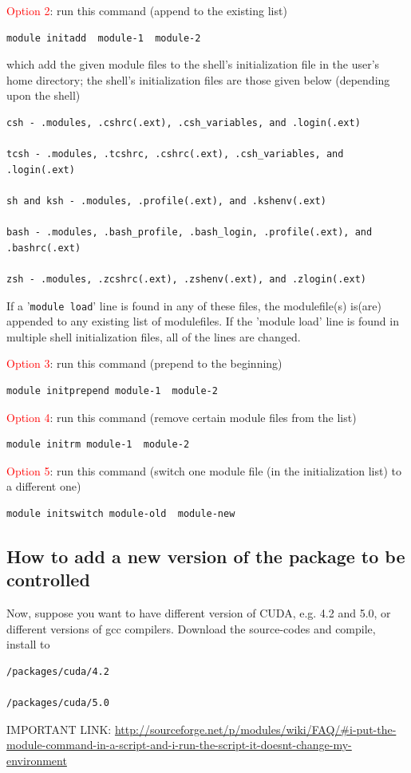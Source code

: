 \textcolor{red}{Option 2}: run this command (append to the existing list)
\begin{verbatim}
module initadd  module-1  module-2 
\end{verbatim}
which  add the given module files to the shell's initialization file in the
user's home directory; the shell's initialization files are those
given below (depending upon the shell)
\begin{verbatim}
csh - .modules, .cshrc(.ext), .csh_variables, and .login(.ext) 

tcsh - .modules, .tcshrc, .cshrc(.ext), .csh_variables, and .login(.ext) 

sh and ksh - .modules, .profile(.ext), and .kshenv(.ext) 

bash - .modules, .bash_profile, .bash_login, .profile(.ext), and .bashrc(.ext) 

zsh - .modules, .zcshrc(.ext), .zshenv(.ext), and .zlogin(.ext)
\end{verbatim}
If a '\verb!module load!' line is found in any of these files, the modulefile(s)
is(are) appended to any existing list of modulefiles.  If the 'module load'
line is found in multiple shell initialization files, all of the lines are changed.

\textcolor{red}{Option 3}: run this command (prepend to the beginning)
\begin{verbatim}
module initprepend module-1  module-2 
\end{verbatim}

\textcolor{red}{Option 4}: run this command (remove certain module files from
the list)
\begin{verbatim}
module initrm module-1  module-2 
\end{verbatim}

\textcolor{red}{Option 5}: run this command (switch one module file (in the
initialization list) to a different one)
\begin{verbatim}
module initswitch module-old  module-new
\end{verbatim}

\subsection{How to add a new version of the package to be controlled}

\begin{mdframed}

Now, suppose you want to have different version of CUDA, e.g. 4.2 and 5.0, or
different versions of gcc compilers. Download the source-codes and compile,
install to
\begin{verbatim}
/packages/cuda/4.2

/packages/cuda/5.0
\end{verbatim}

IMPORTANT
LINK:
\url{http://sourceforge.net/p/modules/wiki/FAQ/#i-put-the-module-command-in-a-script-and-i-run-the-script-it-doesnt-change-my-environment}
\end{mdframed}

